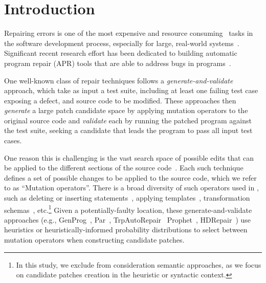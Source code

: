 \documentclass[conference]{IEEEtran}
\begin{document}
\section{Introduction} \label{introduction}
Repairing errors is one of the most expensive\cite{Tassey02,Britton13} and 
resource consuming~\cite{Weiss07} tasks in 
the software development process, especially for large, real-world systems~\cite{Liblit03,Anvik05}.
%
Significant recent research effort has been dedicated to
building automatic program repair (APR) tools that are able to address
bugs in 
programs~\cite{legoues12,kim2013,Weimer13,fan15SPR,long16proph,debroy10,perkins09,wei10}. 

One well-known class of repair techniques follows a 
\emph{generate-and-validate} approach, which take as input a test suite, 
including at
least one failing test case exposing
a defect, and source code to be 
modified.  These approaches then \emph{generate} a large patch candidate space 
by applying 
mutation operators to the original source code and \emph{validate} each by
running the patched  program against the test suite, seeking a candidate that
leads the program to pass all input test cases. 

One reason this is challenging is the vast search space of possible 
edits that can be applied to the different sections of the source 
code~\cite{long16}. Each such technique defines  a set of possible changes to be
applied to the source code, which we refer to as ``Mutation operators''. 
There is a broad diversity of such operators used in , such as deleting or inserting 
statements~\cite{legoues12}, applying templates~\cite{kim2013}, transformation 
schemas~\cite{fan15SPR}, etc.\footnote{In this study, we exclude 
from 
consideration semantic approaches, as we focus on
candidate patches creation in the heuristic or syntactic context.} 
Given a potentially-faulty location, these
generate-and-validate approaches (e.g., GenProg~\cite{legoues12}, 
Par~\cite{kim2013}, TrpAutoRepair~\cite{Qi13TrpAutoR}
Prophet~\cite{long16proph}, HDRepair~\cite{xuan16}) use heuristics or
heuristically-informed probability distributions to select between
mutation operators
when constructing candidate patches.
\end{document}
